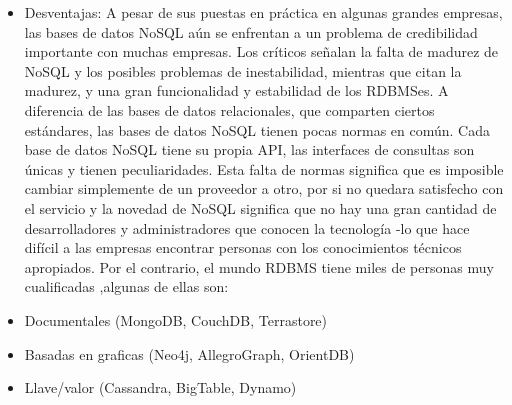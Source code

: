 \documentclass{article}
\begin{document}
\begin{enumerate}
\begin{itemize}
        \item Desventajas: A pesar de sus puestas en práctica en algunas grandes empresas, las bases de datos NoSQL aún se enfrentan a un problema de credibilidad importante con muchas empresas. Los críticos señalan la falta de madurez de NoSQL y los posibles problemas de inestabilidad, mientras que citan la madurez, y una gran funcionalidad y estabilidad de los RDBMSes. A diferencia de las bases de datos relacionales, que comparten ciertos estándares, las bases de datos NoSQL tienen pocas normas en común. Cada base de datos NoSQL tiene su propia API, las interfaces de consultas son únicas y tienen peculiaridades. Esta falta de normas significa que es imposible cambiar simplemente de un proveedor a otro, por si no quedara satisfecho con el servicio y la novedad de NoSQL significa que no hay una gran cantidad de desarrolladores y administradores que conocen la tecnología -lo que hace difícil a las empresas encontrar personas con los conocimientos técnicos apropiados. Por el contrario, el mundo RDBMS tiene miles de personas muy cualificadas ,algunas de ellas son:
        
        \item Documentales (MongoDB, CouchDB, Terrastore)
        
        \item Basadas en graficas (Neo4j, AllegroGraph, OrientDB)
        
        \item Llave/valor (Cassandra, BigTable, Dynamo)
        
        
    \end{itemize}
        
    
\end{enumerate}
\end{document}

